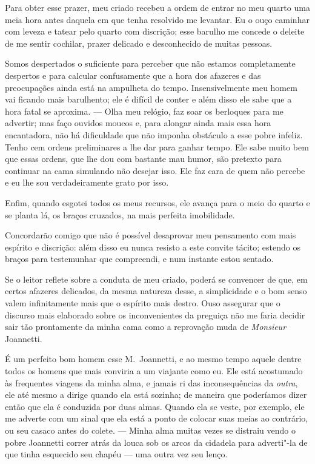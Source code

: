 Para obter esse prazer, meu criado recebeu a ordem de entrar no meu
quarto uma meia hora antes daquela em que tenha resolvido me levantar.
Eu o ouço caminhar com leveza e tatear pelo quarto com discrição; esse
barulho me concede o deleite de me sentir cochilar, prazer delicado e
desconhecido de muitas pessoas.

Somos despertados o suficiente para perceber que não estamos
completamente despertos e para calcular confusamente que a hora dos
afazeres e das preocupações ainda está na ampulheta do tempo.
Insensivelmente meu homem vai ficando mais barulhento; ele é difícil de
conter e além disso ele sabe que a hora fatal se aproxima. --- Olha meu
relógio, faz soar os berloques para me advertir; mas faço ouvidos
moucos e, para alongar ainda mais essa hora encantadora, não há
dificuldade que não imponha obstáculo a esse pobre
infeliz. Tenho cem ordens preliminares a lhe dar para ganhar tempo. Ele
sabe muito bem que essas ordens, que lhe dou com bastante mau humor,
são pretexto para continuar na cama simulando não desejar isso.
Ele faz cara de quem não percebe e eu lhe sou verdadeiramente grato por
isso.

Enfim, quando esgotei todos os meus recursos, ele avança para o meio do
quarto e se planta lá, os braços cruzados, na mais perfeita
imobilidade.

Concordarão comigo que não é possível desaprovar meu pensamento com mais
espírito e discrição: além disso eu nunca resisto a este convite
tácito; estendo os braços para testemunhar que compreendi, e num
instante estou sentado.

Se o leitor reflete sobre a conduta de meu criado, poderá se convencer
de que, em certos afazeres delicados, da mesma natureza desse, a
simplicidade e o bom senso valem infinitamente mais que o espírito mais
destro. Ouso assegurar que o discurso mais elaborado sobre os
inconvenientes da preguiça não me faria decidir sair tão prontamente da
minha cama como a reprovação muda de \textit{Monsieur} Joannetti.

É um perfeito bom homem esse M.~Joannetti, e ao mesmo tempo aquele
dentre todos os homens que mais conviria a um viajante como eu. Ele
está acostumado às frequentes viagens da minha alma, e jamais ri das
inconsequências da \textit{outra}, ele até mesmo a dirige quando ela
está sozinha; de maneira que poderíamos dizer então que ela é conduzida
por duas almas. Quando ela se veste, por exemplo, ele me adverte com um
sinal que ela está a ponto de colocar suas meias ao contrário, ou seu
casaco antes do colete. --- Minha alma muitas vezes se distraiu vendo o
pobre Joannetti correr atrás da louca sob os arcos da cidadela para
adverti"-la de que tinha esquecido seu chapéu --- uma outra vez seu
lenço.


